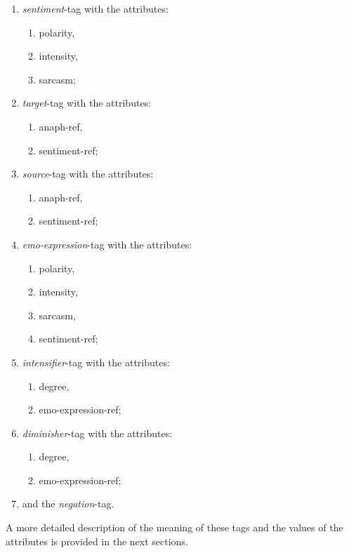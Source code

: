\documentclass[11pt,a4paper]{article}
\begin{document}
\begin{multicols}{2}
  \begin{enumerate}
  \item \textit{sentiment}-tag with the attributes:
    \begin{enumerate}
    \item polarity,
    \item intensity,
    \item sarcasm;
    \end{enumerate}
  \item \textit{target}-tag with the attributes:
    \begin{enumerate}
    \item anaph-ref,
    \item sentiment-ref;
    \end{enumerate}
  \item \textit{source}-tag with the attributes:
    \begin{enumerate}
    \item anaph-ref,
    \item sentiment-ref;
    \end{enumerate}
  \item \textit{emo-expression}-tag with the attributes:
    \begin{enumerate}
    \item polarity,
    \item intensity,
    \item sarcasm,
    \item sentiment-ref;
    \end{enumerate}
  \item \textit{intensifier}-tag with the attributes:
    \begin{enumerate}
    \item degree,
    \item emo-expression-ref;
    \end{enumerate}
  \item \textit{diminisher}-tag with the attributes:
    \begin{enumerate}
    \item degree,
    \item emo-expression-ref;
    \end{enumerate}
  \item and the \textit{negation}-tag.
  \end{enumerate}
\end{multicols}
A more detailed description of the meaning of these tags and the values of the
attributes is provided in the next sections.
\end{document}
